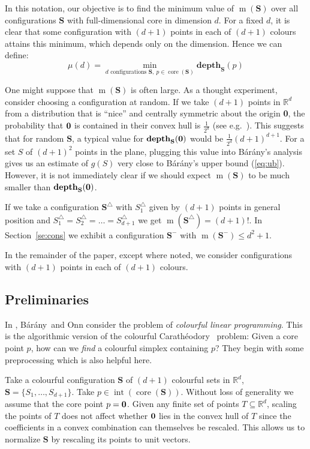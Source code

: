 \documentclass[epsbox,12pt,reqno]{amsart}
\theoremstyle{definition}
\theoremstyle{remark}
\def\csd{\mathbf{depth}}
\def\S{\mathbf{S}}
\def\core{\operatorname{core}}
\def\interior{\operatorname{int}}
\def\bara{B\'ar\'any}
\def\cara{Carath\'eodory}
\def\R{\mathbb{R}}
\def\m{\operatorname{m}}
\def\zero{{\bf 0}}
\begin{document}
In this notation, our objective is to find the minimum value of $\m(\S)$
over all configurations $\S$ with full-dimensional core in dimension $d$.  
For a fixed $d$, it is clear that some configuration with
$(d+1)$ points in each of $(d+1)$ colours attains this minimum,
which depends only on the dimension.  
Hence we can define:
\begin{equation}\label{eq:mu}
\mu(d)= \min_{\text{$d$ configurations } \S, ~ p \in \core(\S)} \csd_\S(p) 
\end{equation}

One might suppose that $\m(\S)$ is often large.
As a thought experiment, consider choosing a configuration
at random.  If we take $(d+1)$ points in 
${\R}^d$ from a distribution that is ``nice'' and centrally 
symmetric about the origin \zero, the probability that $\zero$ is 
contained in their convex hull is $\frac{1}{2^d}$ (see e.g.~\cite{WW01}). 
This suggests that for random $\S$, a typical value for 
$\csd_\S(\zero)$ would be $\frac{1}{2^d}(d+1)^{d+1}$.  
For a set $S$ of $(d+1)^2$
points in the plane, plugging this value into \bara's analysis
gives us an estimate of $g(S)$ very close to \bara's 
upper bound (\ref{eq:ub}).  However, it is not immediately clear 
if we should expect $\m(\S)$ to be much smaller than $\csd_\S(\zero)$.

If we take a configuration $\S^\triangle$ with 
$S^\triangle_1$ given by $(d+1)$ points
in general position and  
$S^\triangle_1 = S^\triangle_2 = \ldots = S^\triangle_{d+1}$
we get $\m(\S^\triangle) = (d+1)!$.  In Section~\ref{se:cons} we 
exhibit a configuration $\S^\minus$ with $\m(\S^\minus) \le d^2+1$.

In the remainder of the paper, except where noted, we consider 
configurations with $(d+1)$ points in each of $(d+1)$ colours.

\subsection{Preliminaries}\label{se:prelim}
In \cite{BO97}, \bara~and Onn consider the problem of 
{\it colourful linear programming}.  This is the 
algorithmic version of the colourful \cara~ problem:
Given a core point $p$, how can we {\it find} a
colourful simplex containing $p$?
They begin with some preprocessing which is also helpful here.

Take a colourful configuration $\S$ of $(d+1)$ colourful sets
in $\R^d$, $\S = \{S_1, \ldots, S_{d+1}\}$.  
Take $p \in \interior(\core(\S))$.
Without loss of generality we assume that the core point $p=\zero$. 
Given any finite set of points $T \subseteq \R^d$, scaling the points of 
$T$ does not affect whether $\zero$ lies in the convex hull
of $T$ since the coefficients in a convex combination can
themselves be rescaled.
This allows us to normalize 
$\S$ by rescaling its points to unit vectors.
\end{document}
